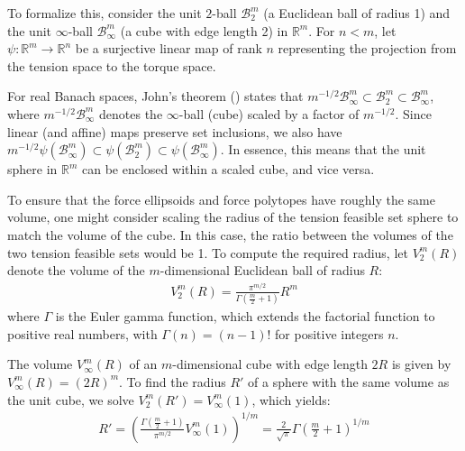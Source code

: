 To formalize this, consider the unit $2$-ball $\mathcal{B}_2^m$ (a Euclidean ball of radius 1) and the unit $\infty$-ball $\mathcal{B}_{\infty}^m$ (a cube with edge length 2) in $\mathbb{R}^m$.  For $n < m$, let $\psi: \mathbb{R}^m \rightarrow \mathbb{R}^n$ be a surjective linear map of rank $n$ representing the projection from the tension space to the torque space.

For real Banach spaces, John's theorem (\cite{johnExtremumProblemsWithInequalities1948}) states that $m^{-1/2}\mathcal{B}_{\infty}^m \subset \mathcal{B}_2^m \subset \mathcal{B}_{\infty}^m$, where $m^{-1/2}\mathcal{B}_{\infty}^m$ denotes the $\infty$-ball (cube) scaled by a factor of $m^{-1/2}$. Since linear (and affine) maps preserve set inclusions, we also have $m^{-1/2}\psi(\mathcal{B}_{\infty}^m) \subset \psi(\mathcal{B}_2^m) \subset \psi(\mathcal{B}_{\infty}^m)$. In essence, this means that the unit sphere in $\mathbb{R}^m$ can be enclosed within a scaled cube, and vice versa.

To ensure that the force ellipsoids and force polytopes have roughly the same volume, one might consider scaling the radius of the tension feasible set sphere to match the volume of the cube. In this case, the ratio between the volumes of the two tension feasible sets would be 1. To compute the required radius, let $V_2^m(R)$ denote the volume of the $m$-dimensional Euclidean ball of radius $R$:
\begin{align}
\label{formula_volume_nsphere}
  V_2^m(R) = \frac{\pi^{m/2}}{\Gamma\left(\frac{m}{2} + 1\right)}R^m
\end{align}
where $\Gamma$ is the Euler gamma function, which extends the factorial function to positive real numbers, with $\Gamma(n) = (n-1)!$ for positive integers $n$.

The volume $V_\infty^m(R)$ of an $m$-dimensional cube with edge length $2R$ is given by $V_{\infty}^m(R) = (2R)^m$.  To find the radius $R'$ of a sphere with the same volume as the unit cube, we solve $V_2^m(R') = V_{\infty}^m(1)$, which yields:
\begin{align}
\label{formula:cube_sphere_same_radius}
R' = \left(\frac{\Gamma\left(\frac{m}{2} + 1\right)}{\pi^{m/2}}V_{\infty}^m(1)\right)^{1/m} = \frac{2}{\sqrt{\pi}}\Gamma\left(\frac{m}{2} + 1\right)^{1/m}
\end{align}


